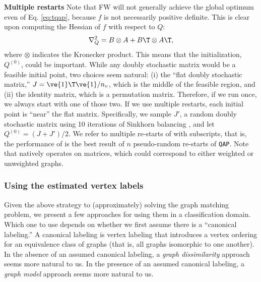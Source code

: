 \documentclass[10pt,journal,cspaper,compsoc]{IEEEtran}
\begin{document}

\textbf{Multiple restarts} Note that FW will not generally achieve the global optimum even of Eq. \eqref{eq:tqap}, because $f$ is not necessarily positive definite.  This is clear upon computing the Hessian of $f$  with respect to $Q$:
\begin{align}
	\nabla_Q^2  =  B \otimes A + B\T \otimes A\T,
\end{align}
where $\otimes$ indicates the Kronecker product. This means that the initialization, $Q^{(0)}$, could be important.  While any doubly stochastic matrix would be a feasible initial point, two choices seem natural: (i) the ``flat doubly  stochastic matrix,'' $J=\ve{1}\T \ve{1}/n_v$, which is the middle of the feasible region, and (ii) the identity matrix, which is a permutation matrix.  Therefore, if we run \qap  once, we always start with one of those two.  If we use multiple restarts, each initial point is ``near'' the flat matrix.  Specifically, we sample $J'$, a random doubly stochastic matrix using 10 iterations of Sinkhorn balancing \cite{Sinkhorn1964}, and let $Q^{(0)}=(J+J')/2$.  We refer to multiple re-starts of \qap with subscripts, that is, the performance of \qapn is the best result of $n$ pseudo-random re-starts of \texttt{QAP}.  Note that \qap natively operates on matrices, which could correspond to either weighted or unweighted graphs.



\subsubsection{Using the estimated vertex labels} %
\label{sec:algorithms}

Given the above strategy to (approximately) solving the graph matching problem, we present a few approaches for using them in a classification domain.  Which one to use depends on whether we first assume there is a ``canonical labeling.''  A canonical labeling is vertex labeling that introduces a vertex ordering for an equivalence class of graphs (that is, all graphs isomorphic to one another).  In the absence of an assumed canonical labeling, a \emph{graph dissimilarity} approach seems more natural to us.  In the presence of an assumed canonical labeling, a \emph{graph model} approach seems more natural to us.
\end{document}
